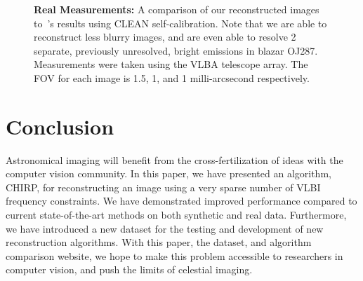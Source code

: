 \begin{figure}[tb]
\begin{center}
\begin{tabular}{  c | c | c | c   }
			
		\end{tabular}
		\caption{ \footnotesize{{\bf Real Measurements:} A comparison of our reconstructed images to~\cite{jorstad2005polarimetric}'s results using CLEAN self-calibration. Note that we are able to reconstruct less blurry images, and are even able to resolve 2 separate, previously unresolved, bright emissions in blazar OJ287. Measurements were taken using the VLBA telescope array. The FOV for each image is 1.5, 1, and 1 milli-arcsecond respectively.} }
		\label{fig:realdata}
		\vspace{-.3in}
	\end{center}
\end{figure}


\vspace{-.1in}
\section{Conclusion}
\vspace{-.1in}
Astronomical imaging will benefit from the cross-fertilization of ideas with the computer vision community. 
In this paper, we have presented an algorithm, CHIRP, for reconstructing an image using a very sparse number of VLBI frequency constraints.
We have demonstrated improved performance compared to current state-of-the-art methods on both synthetic and real data.
Furthermore, we have introduced a new dataset for the testing and
development of new reconstruction algorithms.  
With this paper, the
dataset, and algorithm comparison website, we hope to make this
problem accessible to researchers in computer vision, and push the limits of celestial imaging. 



